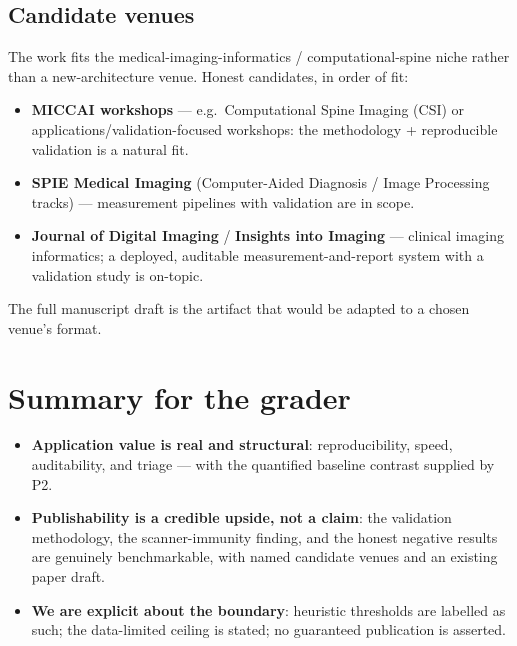 \documentclass[11pt]{article}
\begin{document}
\subsection{Candidate venues}
The work fits the medical-imaging-informatics / computational-spine niche rather than a
new-architecture venue. Honest candidates, in order of fit:
\begin{itemize}
  \item \textbf{MICCAI workshops} --- e.g.\ Computational Spine Imaging (CSI) or
  applications/validation-focused workshops: the methodology + reproducible validation is a natural fit.
  \item \textbf{SPIE Medical Imaging} (Computer-Aided Diagnosis / Image Processing tracks) --- measurement
  pipelines with validation are in scope.
  \item \textbf{Journal of Digital Imaging} / \textbf{Insights into Imaging} --- clinical imaging
  informatics; a deployed, auditable measurement-and-report system with a validation study is on-topic.
\end{itemize}
The full manuscript draft is the artifact that would be adapted to a chosen venue's format.

\section{Summary for the grader}
\begin{itemize}
  \item \textbf{Application value is real and structural}: reproducibility, speed, auditability, and
  triage --- with the quantified baseline contrast supplied by P2.
  \item \textbf{Publishability is a credible upside, not a claim}: the validation methodology, the
  scanner-immunity finding, and the honest negative results are genuinely benchmarkable, with named
  candidate venues and an existing paper draft.
  \item \textbf{We are explicit about the boundary}: heuristic thresholds are labelled as such; the
  data-limited ceiling is stated; no guaranteed publication is asserted.
\end{itemize}
\end{document}
